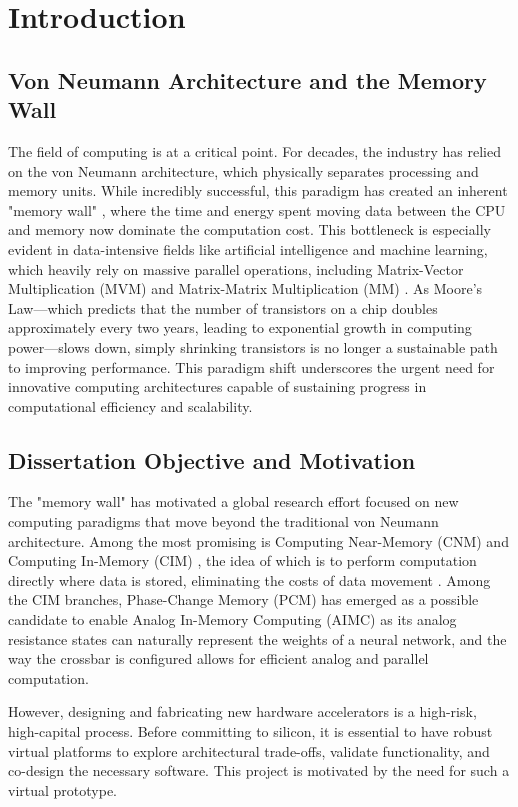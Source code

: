 \chapter{Introduction}\label{chap:intro}
\section{Von Neumann Architecture and the Memory Wall}\label{sec:memwall}
The field of computing is at a critical point. For decades, the industry has relied on the von Neumann architecture, which physically separates processing and memory units.
While incredibly successful, this paradigm has created an inherent "memory wall" \cite{gholami_ai_2024}, where the time and energy spent moving data between the CPU and memory now dominate the computation cost.
This bottleneck is especially evident in data-intensive fields like artificial intelligence and machine learning, which heavily rely on massive parallel operations, including  Matrix-Vector Multiplication (MVM) and Matrix-Matrix Multiplication (MM) \cite{gholami_ai_2024,khan_landscape_2024}.
As Moore's Law—which predicts that the number of transistors on a chip doubles approximately every two years, leading to exponential growth in computing power—slows down, simply shrinking transistors is no longer a sustainable path to improving performance.
This paradigm shift underscores the urgent need for innovative computing architectures capable of sustaining progress in computational efficiency and scalability.

\section{Dissertation Objective and Motivation}\label{sec:obj}

The "memory wall" has motivated a global research effort focused on new computing paradigms that move beyond the traditional von Neumann architecture.
Among the most promising is Computing Near-Memory (CNM) and Computing In-Memory (CIM) , the idea of which is to perform computation directly where data is stored, eliminating the costs of data movement \cite{khan_landscape_2024}.
Among the CIM branches, Phase-Change Memory (PCM) has emerged as a possible candidate to enable Analog In-Memory Computing (AIMC) as its analog resistance states can naturally represent the weights of a neural network, and the way the crossbar is configured allows for efficient analog and parallel computation.

However, designing and fabricating new hardware accelerators is a high-risk, high-capital process. 
Before committing to silicon, it is essential to have robust virtual platforms to explore architectural trade-offs, 
validate functionality, and co-design the necessary software. This project is motivated by the need for such a virtual prototype.

